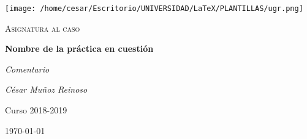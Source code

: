 \documentclass[12pt]{article}
\begin{document}
\begin{titlepage}
  \centering
  \texttt{[image: /home/cesar/Escritorio/UNIVERSIDAD/LaTeX/PLANTILLAS/ugr.png]}\par\vspace{1cm}
  {\scshape\large Asignatura al caso \par} \vspace{1cm}
  {\huge\bfseries Nombre de la práctica en cuestión \par}
  \vspace{0.4cm}
  {\large\itshape Comentario\\}
  \vspace{0.6cm}
  {\large\itshape  César Muñoz Reinoso \par} \vspace{1.00cm}
  Curso 2018-2019 \\
  \vfill

  {\large \today\par}
\end{titlepage}

\tableofcontents
\newpage

\setlength{\parskip}{10pt}
\end{document}
